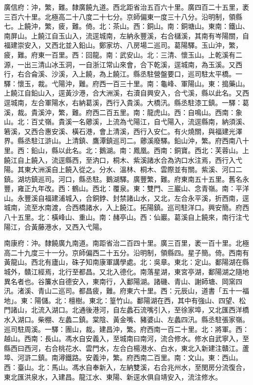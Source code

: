 \begin{pinyinscope}
廣信府：沖，繁，難。隸廣饒九道。西北距省治五百六十里。廣四百二十五里，袤三百六十里。北極高二十八度二十七分。京師偏東一度三十八分。沿明制，領縣七。上饒沖，繁，疲，難。倚。北：茶山。西：銅山。南：銅塘山。東南：鐵山、南屏山。上饒江自玉山入，流逕城南，左納永豐溪，右合櫧溪，其南有岑陽關，自福建崇安入，又西北並入鉛山。鄭家坊、八房場二巡司。葛陽驛。玉山沖，繁，疲，難。府東一百里。西：回龍。南：武安山。北：三清、懷玉山。上乾溪有二源，一出三清山冰玉洞，一自浙江常山來會，合下乾溪，逕城南，為玉溪。又西行，右合侖溪、沙溪，入上饒，為上饒江。縣丞駐營盤要口，巡司駐太平橋。一驛：懷玉，裁。弋陽沖，難。府西一百三十里。南：龜峰、軍陽山。東：搗藥山。上饒江自鉛山入，逕黃沙港，合大洲溪，右瀆自興安入，合弋溪，縣以此名。又西逕城南，左合軍陽水，右納葛溪，西行入貴溪。大橋汛。縣丞駐漆工鎮。一驛：葛溪，裁。貴溪沖，繁，難。府西二百五里。南：龍虎山。西：自鳴山。西南：象山。北：百丈嶺。貴溪一名薌溪，上流為弋陽江，自弋陽入，流逕縣南，納須溪、箬溪，又西合惠安溪、橫石港，會上清溪，西行入安仁。有火燒關，與福建光澤界。縣丞駐江滸山。上清鎮、鷹潭鎮巡司二。薌溪廢驛。鉛山沖，繁。府西南八十里。西：鉛山，縣以此名。北：鵝湖。南：鳳凰。西南：銅寶。西北：芙蓉山。上饒江自上饒入，流逕縣西，至汭口，桐木、紫溪諸水合為汭口水注焉，西行入弋陽。其東大洲溪自上饒入從之。分水、溫林、桐木、雲際並有關。紫溪、河口二鎮。湖坊鎮巡司。河口，縣丞駐。鵝湖驛。廣豐繁，難。府東南五十五里。舊名永豐，雍正九年改。西：鶴山。西北：覆泉。東：雙門、三巖山、念青嶺。南：平洋山。永豐溪自福建浦城入，合銅鋍、封禁諸山水，又北，左合永平溪，折西南，逕城南，流至水南渡，合西橋諸水，入上饒江。拓陽鎮。巡司駐洋口。興安簡。府西八十五里。北：橫峰山、重山。南：赭亭山。西：仙巖。葛溪自上饒來，南行注弋陽江，合黃藤港水，又西入弋陽。

南康府：沖。隸饒廣九南道。南距省治二百四十里。廣三百里，袤一百十里。北極高二十九度三十一分。京師偏西二十五分。沿明制，領縣四。星子簡。倚。西南有黃龍山。西北有廬山，硃子知南康軍講學處。北：吳章。東北：定山。鄱陽湖在縣城外，贛江經焉，北行至都昌。又北入德化。南落星湖，東宮亭湖，鄱陽湖之隨地異名者也。谷簾水自德安入，東南行，入鄱陽湖。諸磯、青山、謝師塘、岡窯四汛。渚溪、青山二巡司。都昌疲，難。府東六十里。西：元辰山，道書「五十一福地」。東：陽儲。北：檀樹。東北：篁竹山。鄱陽湖在西，其中有強山、四望、松門諸山，北流入湖口。北通後港河，自左蠡石流嘴引入，至徐家埠，又北匯西洋橋水入湖口。柴棚、左蠡二鎮。棠陰、黃金嘴、豬婆山、左蠡四汛。縣丞駐張家嶺。巡司駐周溪。一驛：團山，裁。建昌沖，繁。府西南一百二十里。北：將軍。西：越山。西南：長山。馮水自安義入，至城南曰南河，流合修水。修水自武寧入，至縣西曰西河，右合桃花水、雲門水，左合白楊港水、白水，東北入新建注贛江。蘆埠、河滸二鎮。南潯鐵路。安義沖，繁。府西南二百里。南：文山。東：西山。西：臺山。北：馬山。馮水自奉新入，左納雙溪，右合兆州水，至閔房分流復合，東北匯洪泉水，入建昌。龍江水、東陽、新逕水俱自靖安入，流注修水。


\end{pinyinscope}
